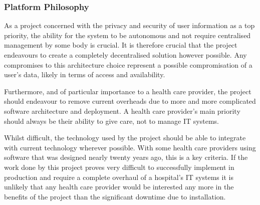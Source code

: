 \subsubsection{Platform Philosophy}

As a project concerned with the privacy and security of user information as a top priority, the ability for the system to be autonomous and not require centralised management by some body is crucial. It is therefore crucial that the project endeavours to create a completely decentralised solution however possible. Any compromises to this architecture choice represent a possible compromisation of a user's data, likely in terms of access and availability.

Furthermore, and of particular importance to a health care provider, the project should endeavour to remove current overheads due to more and more complicated software architecture and deployment. A health care provider's main priority should always be their ability to give care, not to manage IT systems.

Whilst difficult, the technology used by the project should be able to integrate with current technology wherever possible. With some health care providers using software that was designed nearly twenty years ago, this is a key criteria. If the work done by this project proves very difficult to successfully implement in production and require a complete overhaul of a hospital's IT systems it is unlikely that any health care provider would be interested any more in the benefits of the project than the significant downtime due to installation.


